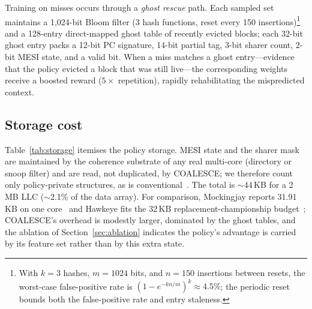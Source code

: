 \documentclass[conference]{IEEEtran}
\begin{document}
Training on misses occurs through a \emph{ghost rescue} path. Each sampled set maintains a 1{,}024-bit Bloom filter (3 hash functions, reset every 150 insertions)\footnote{With $k{=}3$ hashes, $m{=}1024$ bits, and $n{=}150$ insertions between resets, the worst-case false-positive rate is $(1-e^{-kn/m})^k \approx 4.5\%$; the periodic reset bounds both the false-positive rate and entry staleness.} and a 128-entry direct-mapped ghost table of recently evicted blocks; each 32-bit ghost entry packs a 12-bit PC signature, 14-bit partial tag, 3-bit sharer count, 2-bit MESI state, and a valid bit. When a miss matches a ghost entry---evidence that the policy evicted a block that was still live---the corresponding weights receive a boosted reward ($5\times$ repetition), rapidly rehabilitating the mispredicted context.

\subsection{Storage cost}
\label{sec:storage}

Table~\ref{tab:storage} itemises the policy storage. MESI state and the sharer mask are maintained by the coherence substrate of any real multi-core (directory or snoop filter) and are read, not duplicated, by COALESCE; we therefore count only policy-private structures, as is conventional~\cite{jain2016hawkeye,shah2022mockingjay}. The total is ${\sim}44$\,KB for a 2\,MB LLC ($\sim$2.1\% of the data array). For comparison, Mockingjay reports 31.91\,KB on one core~\cite{shah2022mockingjay} and Hawkeye fits the 32\,KB replacement-championship budget~\cite{jain2016hawkeye}; COALESCE's overhead is modestly larger, dominated by the ghost tables, and the ablation of Section~\ref{sec:ablation} indicates the policy's advantage is carried by its feature set rather than by this extra state.

\begin{table}[htbp]
    \centering
    \renewcommand{\arraystretch}{1.2}
    \caption{COALESCE policy storage for a 2\,MB, 2048-set LLC}
    \label{tab:storage}
\end{table}
\end{document}
